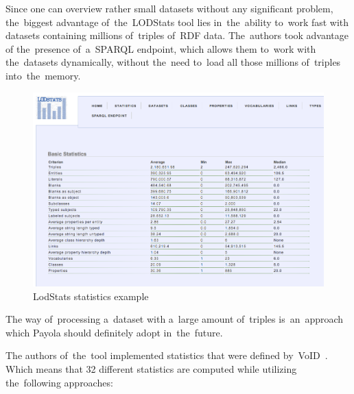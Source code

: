 Since one can overview rather small datasets without any significant problem, 
the~biggest advantage of~the~LODStats tool lies in~the~ability to~work fast with 
datasets containing millions of~triples of~RDF data. The~authors took advantage 
of the~presence of~a~SPARQL endpoint, which allows them to~work with the~datasets 
dynamically, without the~need to~load all those millions of~triples into~the~memory.


\begin{figure}
	\centering
	\includegraphics[width=140mm]{img/lodstats.png}
	\caption{LodStats statistics example}
	\label{fig:lodstats}
\end{figure}

The way of~processing a~dataset with a~large amount of~triples is~an~approach 
which Payola should definitely adopt in~the~future.

The authors of~the~tool implemented statistics that were defined by~VoID~\cite{void}. Which 
means that 32 different statistics are computed while utilizing the~following 
approaches:


